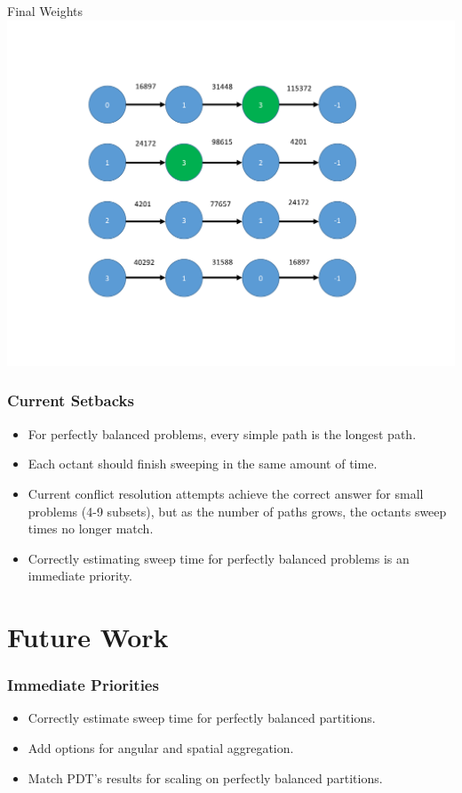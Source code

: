 \documentclass[xcolor={usenames,dvipsnames,svgnames,table}]{beamer}
\begin{document}
\begin{frame}[t]{Final Weights}
\centering
\includegraphics[trim={2cm 2cm 4cm 2cm},clip,scale=0.45]{figures/final.pdf}
\end{frame}

\begin{frame}[t]\frametitle{Current Setbacks}
\begin{block}{}
\begin{itemize}
	\item For perfectly balanced problems, every simple path is the longest path.
	\item Each octant should finish sweeping in the same amount of time.
	\item Current conflict resolution attempts achieve the correct answer for small problems (4-9 subsets), but as the number of paths grows, the octants sweep times no longer match.
	\item Correctly estimating sweep time for perfectly balanced problems is an immediate priority.
\end{itemize}
\end{block}
\end{frame}

\section{Future Work}

\begin{frame}[t]\frametitle{Immediate Priorities}
\begin{block}{}
\begin{itemize}
	\item Correctly estimate sweep time for perfectly balanced partitions.
	\item Add options for angular and spatial aggregation.
	\item Match PDT's results for scaling on perfectly balanced partitions.
\end{itemize}
\end{block}
\end{frame}
\end{document}

